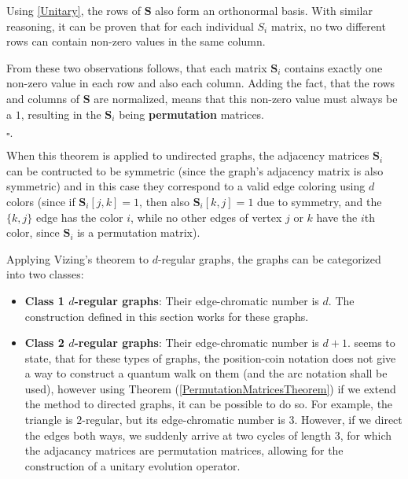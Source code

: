 Using \hyperref[Unitary]{[Unitary]}, the rows of $\mathbf{S}$ also form an orthonormal basis. With similar reasoning, it can be proven that for each individual $S_i$ matrix, no two different rows can contain non-zero values in the same column.

From these two observations follows, that each matrix $\mathbf{S}_i$ contains exactly one non-zero value in each row and also each column. Adding the fact, that the rows and columns of $\mathbf{S}$ are normalized, means that this non-zero value must always be a $1$, resulting in the $\mathbf{S}_i$ being \textbf{permutation} matrices.

\begin{flushright}
$\square{}.$
\end{flushright}

When this theorem is applied to undirected graphs, the adjacency matrices $\mathbf{S}_i$ can be contructed to be symmetric (since the graph's adjacency matrix is also symmetric) and in this case they correspond to a valid edge coloring using $d$ colors (since if $\mathbf{S}_i[j,k] = 1$, then also $\mathbf{S}_i[k,j] = 1$ due to symmetry, and the $\{k,j\}$ edge has the color $i$, while no other edges of vertex $j$ or $k$ have the $i$th color, since $\mathbf{S}_i$ is a permutation matrix).

Applying Vizing's theorem to $d$-regular graphs, the graphs can be categorized into two classes:
\begin{itemize}
\item \textbf{Class 1 $d$-regular graphs}: Their edge-chromatic number is $d$. The construction defined in this section works for these graphs.
\item \textbf{Class 2 $d$-regular graphs}: Their edge-chromatic number is $d+1$. \cite{Portugal} seems to state, that for these types of graphs, the position-coin notation does not give a way to construct a quantum walk on them (and the arc notation shall be used), however using Theorem (\ref{PermutationMatricesTheorem}) if we extend the method to directed graphs, it can be possible to do so. For example, the triangle is $2$-regular, but its edge-chromatic number is $3$. However, if we direct the edges both ways, we suddenly arrive at two cycles of length 3, for which the adjacancy matrices are permutation matrices, allowing for the construction of a unitary evolution operator.

\end{itemize}